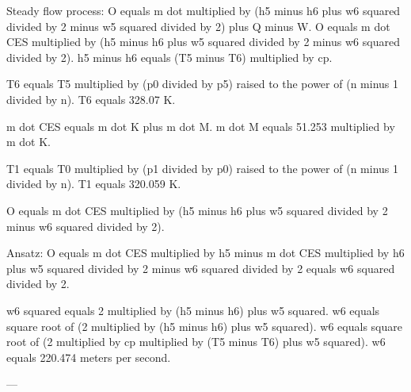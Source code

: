 Steady flow process:  
O equals m dot multiplied by (h5 minus h6 plus w6 squared divided by 2 minus w5 squared divided by 2) plus Q minus W.  
O equals m dot CES multiplied by (h5 minus h6 plus w5 squared divided by 2 minus w6 squared divided by 2).  
h5 minus h6 equals (T5 minus T6) multiplied by cp.  

T6 equals T5 multiplied by (p0 divided by p5) raised to the power of (n minus 1 divided by n).  
T6 equals 328.07 K.  

m dot CES equals m dot K plus m dot M.  
m dot M equals 51.253 multiplied by m dot K.  

T1 equals T0 multiplied by (p1 divided by p0) raised to the power of (n minus 1 divided by n).  
T1 equals 320.059 K.  

O equals m dot CES multiplied by (h5 minus h6 plus w5 squared divided by 2 minus w6 squared divided by 2).  

Ansatz:  
O equals m dot CES multiplied by h5 minus m dot CES multiplied by h6 plus w5 squared divided by 2 minus w6 squared divided by 2 equals w6 squared divided by 2.  

w6 squared equals 2 multiplied by (h5 minus h6) plus w5 squared.  
w6 equals square root of (2 multiplied by (h5 minus h6) plus w5 squared).  
w6 equals square root of (2 multiplied by cp multiplied by (T5 minus T6) plus w5 squared).  
w6 equals 220.474 meters per second.  

---